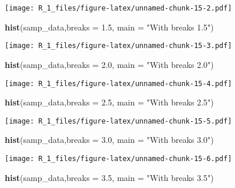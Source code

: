 \documentclass[
]{article}
\newenvironment{Shaded}{\begin{snugshade}}{\end{snugshade}}
\newcommand{\AttributeTok}[1]{\textcolor[rgb]{0.13,0.29,0.53}{#1}}
\newcommand{\FloatTok}[1]{\textcolor[rgb]{0.00,0.00,0.81}{#1}}
\newcommand{\FunctionTok}[1]{\textcolor[rgb]{0.13,0.29,0.53}{\textbf{#1}}}
\newcommand{\NormalTok}[1]{#1}
\newcommand{\StringTok}[1]{\textcolor[rgb]{0.31,0.60,0.02}{#1}}
\begin{document}
\texttt{[image: R\_1\_files/figure-latex/unnamed-chunk-15-2.pdf]}

\begin{Shaded}
\begin{Highlighting}[]
  \FunctionTok{hist}\NormalTok{(samp\_data,}\AttributeTok{breaks =} \FloatTok{1.5}\NormalTok{, }\AttributeTok{main =} \StringTok{"With breaks 1.5"}\NormalTok{)}
\end{Highlighting}
\end{Shaded}

\texttt{[image: R\_1\_files/figure-latex/unnamed-chunk-15-3.pdf]}

\begin{Shaded}
\begin{Highlighting}[]
  \FunctionTok{hist}\NormalTok{(samp\_data,}\AttributeTok{breaks =} \FloatTok{2.0}\NormalTok{, }\AttributeTok{main =} \StringTok{"With breaks 2.0"}\NormalTok{)}
\end{Highlighting}
\end{Shaded}

\texttt{[image: R\_1\_files/figure-latex/unnamed-chunk-15-4.pdf]}

\begin{Shaded}
\begin{Highlighting}[]
  \FunctionTok{hist}\NormalTok{(samp\_data,}\AttributeTok{breaks =} \FloatTok{2.5}\NormalTok{, }\AttributeTok{main =} \StringTok{"With breaks 2.5"}\NormalTok{)}
\end{Highlighting}
\end{Shaded}

\texttt{[image: R\_1\_files/figure-latex/unnamed-chunk-15-5.pdf]}

\begin{Shaded}
\begin{Highlighting}[]
  \FunctionTok{hist}\NormalTok{(samp\_data,}\AttributeTok{breaks =} \FloatTok{3.0}\NormalTok{, }\AttributeTok{main =} \StringTok{"With breaks 3.0"}\NormalTok{)}
\end{Highlighting}
\end{Shaded}

\texttt{[image: R\_1\_files/figure-latex/unnamed-chunk-15-6.pdf]}

\begin{Shaded}
\begin{Highlighting}[]
  \FunctionTok{hist}\NormalTok{(samp\_data,}\AttributeTok{breaks =} \FloatTok{3.5}\NormalTok{, }\AttributeTok{main =} \StringTok{"With breaks 3.5"}\NormalTok{)}
\end{Highlighting}
\end{Shaded}
\end{document}

